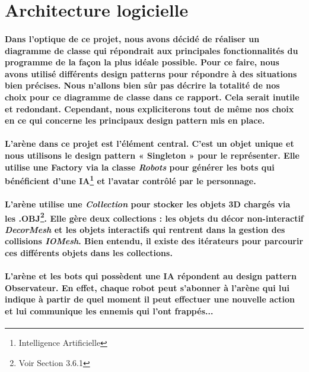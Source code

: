 \newpage
\section{Architecture logicielle}
\vspace{0.5cm}
\paragraph{Dans l'optique de ce projet, nous avons décidé de réaliser un diagramme de classe qui répondrait aux principales fonctionnalités du programme de la façon la plus idéale possible. Pour ce faire, nous avons utilisé différents design patterns pour répondre à des situations bien précises. Nous n'allons bien s\^ur pas décrire la totalité de nos choix pour ce diagramme de classe dans ce rapport. Cela serait inutile et redondant. Cependant, nous expliciterons tout de même nos choix en ce qui concerne les principaux design pattern mis en place.}

\paragraph{L'arène dans ce projet est l'élément central. C'est un objet unique et nous utilisons le design pattern « \textbf{Singleton} » pour le représenter. Elle utilise une \textbf{Factory} via la classe \textit{Robots} pour générer les bots qui bénéficient d'une IA\footnote{Intelligence Artificielle} et l'avatar contrôlé par le personnage.}

\paragraph{L'arène utilise une \textit{Collection} pour stocker les objets 3D chargés via les .OBJ\footnote{Voir Section 3.6.1}. Elle gère deux collections : les objets du décor non-interactif \textit{DecorMesh} et les objets interactifs qui rentrent dans la gestion des collisions \textit{IOMesh}. Bien entendu, il existe des itérateurs pour parcourir ces différents objets dans les collections.}

\paragraph{L'arène et les bots qui possèdent une IA répondent au design pattern \textbf{Observateur}. En effet, chaque robot peut s'abonner à l'arène qui lui indique à partir de quel moment il peut effectuer une nouvelle action et lui communique les ennemis qui l'ont frappés...}

